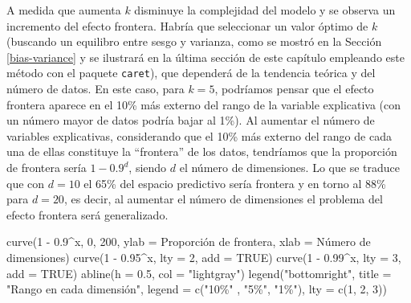 \documentclass[
  spanish,
]{book}
\newenvironment{Shaded}{\begin{snugshade}}{\end{snugshade}}
\newcommand{\AttributeTok}[1]{\textcolor[rgb]{0.77,0.63,0.00}{#1}}
\newcommand{\ConstantTok}[1]{\textcolor[rgb]{0.00,0.00,0.00}{#1}}
\newcommand{\DecValTok}[1]{\textcolor[rgb]{0.00,0.00,0.81}{#1}}
\newcommand{\FloatTok}[1]{\textcolor[rgb]{0.00,0.00,0.81}{#1}}
\newcommand{\FunctionTok}[1]{\textcolor[rgb]{0.00,0.00,0.00}{#1}}
\newcommand{\NormalTok}[1]{#1}
\newcommand{\SpecialCharTok}[1]{\textcolor[rgb]{0.00,0.00,0.00}{#1}}
\newcommand{\StringTok}[1]{\textcolor[rgb]{0.31,0.60,0.02}{#1}}
\theoremstyle{break}
\theoremstyle{definition}
\theoremstyle{definition}
\theoremstyle{definition}
\theoremstyle{definition}
\theoremstyle{remark}
\begin{document}
A medida que aumenta \(k\) disminuye la complejidad del modelo y se observa un incremento del efecto frontera.
Habría que seleccionar un valor óptimo de \(k\) (buscando un equilibro entre sesgo y varianza, como se mostró en la Sección \ref{bias-variance} y se ilustrará en la última sección de este capítulo empleando este método con el paquete \texttt{caret}), que dependerá de la tendencia teórica y del número de datos.
En este caso, para \(k=5\), podríamos pensar que el efecto frontera aparece en el 10\% más externo del rango de la variable explicativa (con un número mayor de datos podría bajar al 1\%).
Al aumentar el número de variables explicativas, considerando que el 10\% más externo del rango de cada una de ellas constituye la ``frontera'' de los datos, tendríamos que la proporción de frontera sería \(1-0.9^d\), siendo \(d\) el número de dimensiones.
Lo que se traduce que con \(d = 10\) el 65\% del espacio predictivo sería frontera y en torno al 88\% para \(d=20\), es decir, al aumentar el número de dimensiones el problema del efecto frontera será generalizado.

\begin{Shaded}
\begin{Highlighting}[]
\FunctionTok{curve}\NormalTok{(}\DecValTok{1} \SpecialCharTok{{-}} \FloatTok{0.9}\SpecialCharTok{\^{}}\NormalTok{x, }\DecValTok{0}\NormalTok{, }\DecValTok{200}\NormalTok{, }\AttributeTok{ylab =} \StringTok{\textquotesingle{}Proporción de frontera\textquotesingle{}}\NormalTok{, }\AttributeTok{xlab =} \StringTok{\textquotesingle{}Número de dimensiones\textquotesingle{}}\NormalTok{)}
\FunctionTok{curve}\NormalTok{(}\DecValTok{1} \SpecialCharTok{{-}} \FloatTok{0.95}\SpecialCharTok{\^{}}\NormalTok{x, }\AttributeTok{lty =} \DecValTok{2}\NormalTok{, }\AttributeTok{add =} \ConstantTok{TRUE}\NormalTok{)}
\FunctionTok{curve}\NormalTok{(}\DecValTok{1} \SpecialCharTok{{-}} \FloatTok{0.99}\SpecialCharTok{\^{}}\NormalTok{x, }\AttributeTok{lty =} \DecValTok{3}\NormalTok{, }\AttributeTok{add =} \ConstantTok{TRUE}\NormalTok{)}
\FunctionTok{abline}\NormalTok{(}\AttributeTok{h =} \FloatTok{0.5}\NormalTok{, }\AttributeTok{col =} \StringTok{"lightgray"}\NormalTok{)}
\FunctionTok{legend}\NormalTok{(}\StringTok{"bottomright"}\NormalTok{, }\AttributeTok{title =} \StringTok{"Rango en cada dimensión"}\NormalTok{, }\AttributeTok{legend =} \FunctionTok{c}\NormalTok{(}\StringTok{"10\%"}\NormalTok{ , }\StringTok{"5\%"}\NormalTok{, }\StringTok{"1\%"}\NormalTok{), }
       \AttributeTok{lty =} \FunctionTok{c}\NormalTok{(}\DecValTok{1}\NormalTok{, }\DecValTok{2}\NormalTok{, }\DecValTok{3}\NormalTok{))}
\end{Highlighting}
\end{Shaded}
\end{document}
